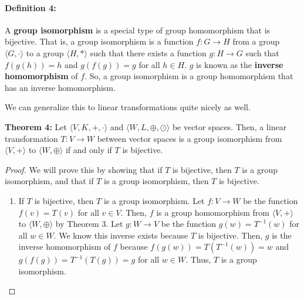 \documentclass[twoside]{article}
\begin{document}
\begin{spacing}{1.25}
\paragraph*{Definition 4:} A \textbf{group isomorphism} is a special type of group homomorphism
that is bijective. That is, a group isomorphism is a function $f:G\rightarrow H$ from a group
$\langle G, \cdot\rangle$ to a group $\langle H, *\rangle$ such that there exists 
a function $g:H\rightarrow G$ such that $f(g(h)) = h$ and $g(f(g)) = g$ for all $h\in H$.
$g$ is known as the \textbf{inverse homomorphism} of $f$. So, a group isomorphism is a
group homomorphism that has an inverse homomorphism.

We can generalize this to linear transformations quite nicely as well.
\begin{mdframed}[roundcorner=10pt, backgroundcolor=gray!10]
  \textbf{Theorem 4:} Let $\langle V, K, +, \cdot \rangle$ and 
  $\langle W, L, \oplus, \odot \rangle$ be vector spaces. Then, a linear transformation
  $T:V\rightarrow W$ between vector spaces is a group isomorphism from $\langle V, + \rangle$ to $\langle W, \oplus \rangle$ if and only if $T$ is bijective.
\end{mdframed}

\begin{proof}
  We will prove this by showing that if $T$ is bijective, then $T$ is a group isomorphism, and that if $T$ is a group isomorphism, then $T$ is bijective.
  \begin{enumerate}
    \item If $T$ is bijective, then $T$ is a group isomorphism. 
    Let $f:V\rightarrow W$ be the function $f(v) = T(v)$ for all $v\in V$. 
    Then, $f$ is a group homomorphism from $\langle V, + \rangle$ to 
    $\langle W, \oplus \rangle$ by Theorem 3. Let $g:W\rightarrow V$ be the 
    function $g(w) = T^{-1}(w)$ for all $w\in W$. We know this 
    inverse exists because $T$ is bijective. Then, $g$ is the inverse 
    homomorphism of $f$ because $f(g(w)) = T(T^{-1}(w)) = w$ and 
    $g(f(g)) = T^{-1}(T(g)) = g$ for all $w\in W$. Thus, $T$ is a group isomorphism.


\end{enumerate}
\end{proof}
\end{spacing}
\end{document}
